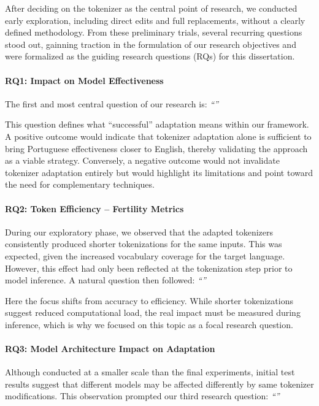 After deciding on the tokenizer as the central point of research, we conducted early exploration, including direct edits and full replacements, without a clearly defined methodology. 
From these preliminary trials, several recurring questions stood out, gainning traction in the formulation of our research objectives and were formalized as the guiding research questions (RQs) for this dissertation.


\paragraph{RQ1: Impact on Model Effectiveness}
The first and most central question of our research is: \textit{``\RQone''}  

This question defines what ``successful'' adaptation means within our framework. A positive outcome would indicate that tokenizer adaptation alone is sufficient to bring Portuguese effectiveness closer to English, thereby validating the approach as a viable strategy. Conversely, a negative outcome would not invalidate tokenizer adaptation entirely but would highlight its limitations and point toward the need for complementary techniques.

\paragraph{RQ2: Token Efficiency – Fertility Metrics}
During our exploratory phase, we observed that the adapted tokenizers consistently produced shorter tokenizations for the same inputs. This was expected, given the increased vocabulary coverage for the target language. However, this effect had only been reflected at the tokenization step prior to model inference. A natural question then followed: \textit{``\RQtwo''}  

Here the focus shifts from accuracy to efficiency. While shorter tokenizations suggest reduced computational load, the real impact must be measured during inference, which is why we focused on this topic as a focal research question.



\paragraph{RQ3: Model Architecture Impact on Adaptation}
Although conducted at a smaller scale than the final experiments, initial test results suggest that different models may be affected differently by same tokenizer modifications. This observation prompted our third research question: \textit{``\RQthree''} 

